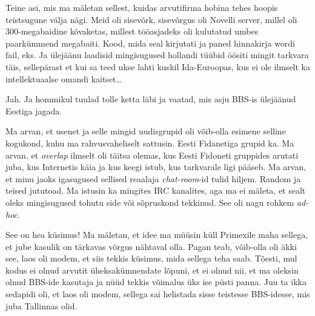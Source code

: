 Teine asi, mis ma mäletan sellest, kuidas arvutifirma hobina tehes hoopis teistsugune välja nägi. Meid oli sisevõrk, sisevõrgus oli Novelli server, millel oli 300-megabaidine kõvaketas, millest tööasjadeks oli kulutatud umbes paarkümmend megabaiti. Kood, mida seal kirjutati ja paned hinnakirja wordi fail, eks. Ja ülejäänu laadisid mingisugused hollandi tüübid öösiti mingit tarkvara täis, sellepärast et kui sa teed ukse lahti kuskil Ida-Euroopas, kus ei ole ilmselt ka intellektuaalse omandi kaitset\ldots


Jah. Ja hommikul tuulad tolle ketta läbi ja vaatad, mis asju BBS-is ülejäänud Eestiga jagada. 


Ma arvan, et usenet ja selle mingid uudisgrupid oli võib-olla esimene selline kogukond, kuhu ma rahvusvaheliselt sattusin. Eesti Fidanetiga grupid ka. Ma arvan, et \emph{overlap} ilmselt oli täitsa olemas, kus Eesti Fidoneti gruppides arutati juba, kus Internetis käia ja kus keegi istub, kus tarkvarale ligi pääseb. Ma arvan, et minu jaoks igasugused sellised reaalaja \emph{chat-room}-id tulid hiljem. Random ja teised jututoad. Ma istusin ka mingites IRC kanalites, aga ma  ei mäleta, et sealt oleks mingisugused tohutu side või sõpruskond tekkinud. See oli nagu rohkem \emph{ad-hoc}. 


See on hea küsimus! Ma mäletan, et idee ma müüsin küll Primexile maha sellega, et jube kasulik on tärkavas võrgus nähtaval olla. Pagan teab, võib-olla  oli äkki see, laos oli modem, et siis tekkis küsimus, mida sellega teha saab. Tõesti, mul kodus ei olnud arvutit üheksakümnendate lõpuni, et ei olnud nii, et ma oleksin olnud BBS-ide kasutaja ja nüüd tekkis võimalus üks ise püsti panna. Juu ta ikka sedapidi oli, et laos oli modem, sellega sai helistada sisse teistesse BBS-idesse, mis juba Tallinnas olid.

